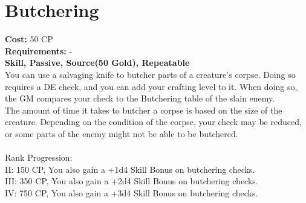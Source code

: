 \section{Butchering}\label{perk:butchering}
\textbf{Cost:} 50 CP\\
\textbf{Requirements:} -\\
\textbf{Skill, Passive, Source(50 Gold), Repeatable}\\
You can use a salvaging knife to butcher parts of a creature's corpse.
Doing so requires a DE check, and you can add your crafting level to it.
When doing so, the GM compares your check to the Butchering table of the slain enemy.\\
The amount of time it takes to butcher a corpse is based on the size of the creature.
Depending on the condition of the corpse, your check may be reduced, or some parts of the enemy might not be able to be butchered.\\
\\
Rank Progression:\\
II: 150 CP, You also gain a +1d4 Skill Bonus on butchering checks.\\
III: 350 CP, You also gain a +2d4 Skill Bonus on butchering checks.\\
IV: 750 CP, You also gain a +3d4 Skill Bonus on butchering checks.\\